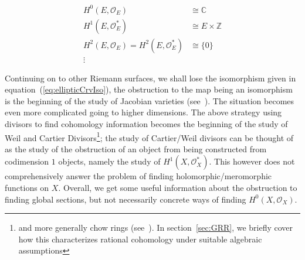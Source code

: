 \documentclass{ut-thesis}
\newcommand{\Z}{{\mathbb{Z}}}
\newcommand{\C}{{\mathbb{C}}}
\newcommand{\CO}{{\mathcal{O}}}
\begin{document}
\begin{align*}
  H^0(E, \CO_{E}) &\cong \C\\
  H^1(E, \CO_{E}^*) &\cong E\times \Z\\
  H^2(E, \CO_{E}) = H^2(E, \CO_{E}^*)&\cong \{0\}\\
  \vdots
\end{align*}

Continuing on to other Riemann surfaces, we shall lose the isomorphism given in
equation~(\ref{eq:ellipticCrvIso}), the obstruction to the map being an isomorphism is the beginning of the
study of Jacobian varieties (see~\cite[section~6.4]{NateComplexAnalysis}). The situation becomes even more
complicated going to higher dimensions. The above strategy using divisors to find cohomology information
becomes the beginning of the study of Weil and Cartier Divisors\footnote{and more generally chow rings
(see~\cite{NateAlgGeo}). In section~\ref{sec:GRR}, we briefly cover how this characterizes rational cohomology under
suitable algebraic assumptions}; the study of Cartier/Weil divisors can be thought of as the study of the
obstruction of an object from being constructed from codimension $1$ objects, namely the study of $H^1(X,
\CO_X^*)$. This however does not comprehensively answer the problem of finding holomorphic/meromorphic
functions on $X$. Overall, we get some useful information about the obstruction to finding global sections,
but not necessarily concrete ways of finding $H^0(X, \CO_X)$.
\end{document}
